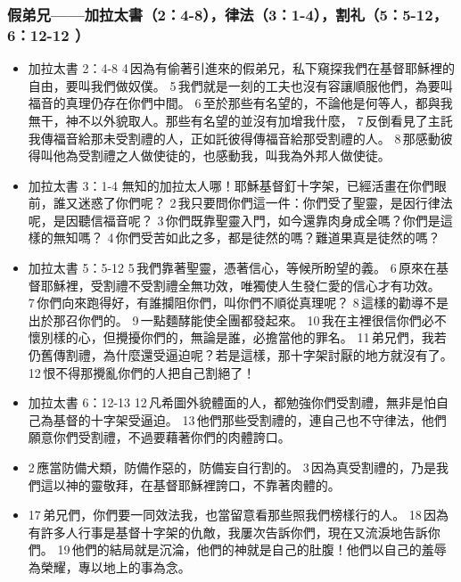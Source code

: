  \subsubsection{假弟兄——加拉太書（2：4-8），律法（3：1-4），割礼（5：5-12，6：12-12 ） } 
 \begin{itemize}
 \itemsep-.25em
\item 加拉太書 2：4-8
  4 因為有偷著引進來的假弟兄，私下窺探我們在基督耶穌裡的自由，要叫我們做奴僕。 5 我們就是一刻的工夫也沒有容讓順服他們，為要叫福音的真理仍存在你們中間。 6 至於那些有名望的，不論他是何等人，都與我無干，神不以外貌取人。那些有名望的並沒有加增我什麼， 7 反倒看見了主託我傳福音給那未受割禮的人，正如託彼得傳福音給那受割禮的人。 8 那感動彼得叫他為受割禮之人做使徒的，也感動我，叫我為外邦人做使徒。
\item  加拉太書 3：1-4
 無知的加拉太人哪！耶穌基督釘十字架，已經活畫在你們眼前，誰又迷惑了你們呢？ 2 我只要問你們這一件：你們受了聖靈，是因行律法呢，是因聽信福音呢？ 3 你們既靠聖靈入門，如今還靠肉身成全嗎？你們是這樣的無知嗎？ 4 你們受苦如此之多，都是徒然的嗎？難道果真是徒然的嗎？
 \item 加拉太書 5：5-12
  5 我們靠著聖靈，憑著信心，等候所盼望的義。 6 原來在基督耶穌裡，受割禮不受割禮全無功效，唯獨使人生發仁愛的信心才有功效。 7 你們向來跑得好，有誰攔阻你們，叫你們不順從真理呢？ 8 這樣的勸導不是出於那召你們的。 9 一點麵酵能使全團都發起來。 10 我在主裡很信你們必不懷別樣的心，但攪擾你們的，無論是誰，必擔當他的罪名。 11 弟兄們，我若仍舊傳割禮，為什麼還受逼迫呢？若是這樣，那十字架討厭的地方就沒有了。 12 恨不得那攪亂你們的人把自己割絕了！
\item 加拉太書 6：12-13 
   12 凡希圖外貌體面的人，都勉強你們受割禮，無非是怕自己為基督的十字架受逼迫。 13 他們那些受割禮的，連自己也不守律法，他們願意你們受割禮，不過要藉著你們的肉體誇口。
  \end{itemize}
 
  \begin{itemize}
 \itemsep-.25em
\item  2 應當防備犬類，防備作惡的，防備妄自行割的。 3 因為真受割禮的，乃是我們這以神的靈敬拜，在基督耶穌裡誇口，不靠著肉體的。
 \item 17 弟兄們，你們要一同效法我，也當留意看那些照我們榜樣行的人。 18 因為有許多人行事是基督十字架的仇敵，我屢次告訴你們，現在又流淚地告訴你們。 19 他們的結局就是沉淪，他們的神就是自己的肚腹！他們以自己的羞辱為榮耀，專以地上的事為念。
 \end{itemize}
 
